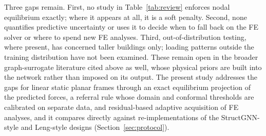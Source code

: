 Three gaps remain. First, no study in Table~\ref{tab:review} enforces nodal equilibrium exactly; where it appears at all, it is a soft penalty. Second, none quantifies predictive uncertainty or uses it to decide when to fall back on the FE solver or where to spend new FE analyses. Third, out-of-distribution testing, where present, has concerned taller buildings only; loading patterns outside the training distribution have not been examined. These remain open in the broader graph-surrogate literature cited above as well, whose physical priors are built into the network rather than imposed on its output. The present study addresses the gaps for linear static planar frames through an exact equilibrium projection of the predicted forces, a referral rule whose domain and conformal thresholds are calibrated on separate data, and residual-based adaptive acquisition of FE analyses, and it compares directly against re-implementations of the StructGNN-style and Leng-style designs (Section~\ref{sec:protocol}).


